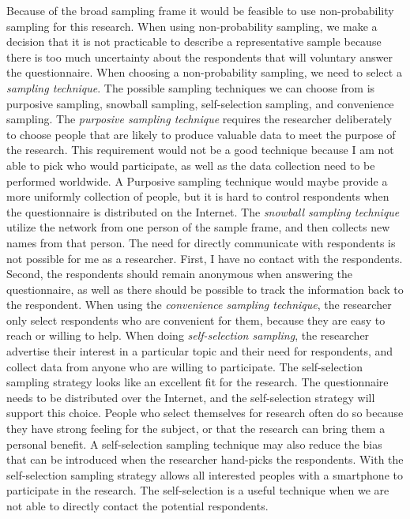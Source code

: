     Because of the broad sampling frame it would be feasible to use non-probability sampling for this research. When using non-probability sampling, we make a decision that it is not practicable to describe a representative sample because there is too much uncertainty about the respondents that will voluntary answer the questionnaire. When choosing a non-probability sampling, we need to select a {\it sampling technique}. The possible sampling techniques we can choose from is purposive sampling, snowball sampling, self-selection sampling, and convenience sampling. 
    The {\it purposive sampling technique} requires the researcher deliberately to choose people that are likely to produce valuable data to meet the purpose of the research. This requirement would not be a good technique because I am not able to pick who would participate, as well as the data collection need to be performed worldwide. A Purposive sampling technique would maybe provide a more uniformly collection of people, but it is hard to control respondents when the questionnaire is distributed on the Internet. 
    The {\it snowball sampling technique} utilize the network from one person of the sample frame, and then collects new names from that person. The need for directly communicate with respondents is not possible for me as a researcher. {First}, I have no contact with the respondents. {Second}, the respondents should remain anonymous when answering the questionnaire, as well as there should be possible to track the information back to the respondent. 
    When using the {\it convenience sampling technique}, the researcher only select respondents who are convenient for them, because they are easy to reach or willing to help. 
    When doing {\it self-selection sampling}, the researcher advertise their interest in a particular topic and their need for respondents, and collect data from anyone who are willing to participate. The self-selection sampling strategy looks like an excellent fit for the research. The questionnaire needs to be distributed over the Internet, and the self-selection strategy will support this choice. People who select themselves for research often do so because they have strong feeling for the subject, or that the research can bring them a personal benefit. A self-selection sampling technique may also reduce the bias that can be introduced when the researcher hand-picks the respondents. With the self-selection sampling strategy allows all interested peoples with a smartphone to participate in the research. The self-selection is a useful technique when we are not able to directly contact the potential respondents.

